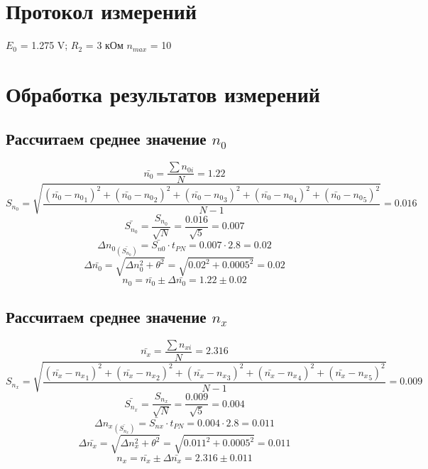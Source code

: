 \documentclass[a4paper,12pt]{report}
\begin{document}
\newpage

\section*{Протокол измерений}

\begin{flushleft}
    
\end{flushleft}

$E_0$ = 1.275 V; $R_2$ = 3 кОм $n_{max}$ = 10


\newpage
\section*{Обработка результатов измерений}

\subsection*{Рассчитаем среднее значение $n_0$}

\[ \bar{n_0} = \frac{\sum n_{0i}}{N} = 1.22 \]
\[S_{n_0}=\sqrt{\frac{(\bar{n_0}-{n_0}_1)^2+(\bar{n_0}-{n_0}_2)^2+(\bar{n_0}-{n_0}_3)^2+(\bar{n_0}-{n_0}_4)^2+(\bar{n_0}-{n_0}_5)^2}{N-1}} = 0.016\]
\[\bar{S_{n_0}}=\frac{S_{n_0}}{\sqrt{N}}=\frac{0.016}{\sqrt{5}}=0.007\]
\[ \Delta{n_0}_{(\bar{S_{n_0}})}=\bar{S_{n0}}\cdot t_{PN}=0.007\cdot 2.8=0.02 \]
\[ \Delta{\bar{n_0}}=\sqrt{\Delta n_0^2 + \theta^2}=\sqrt{0.02^2 + 0.0005^2}=0.02 \]
\[{n_0}=\bar{n_0}\pm \Delta{\bar{n_0}}=1.22\pm 0.02\]

\subsection*{Рассчитаем среднее значение $n_x$}

\[ \bar{n_x} = \frac{\sum n_{xi}}{N} = 2.316 \]
\[S_{n_x}=\sqrt{\frac{(\bar{n_x}-{n_x}_1)^2+(\bar{n_x}-{n_x}_2)^2+(\bar{n_x}-{n_x}_3)^2+(\bar{n_x}-{n_x}_4)^2+(\bar{n_x}-{n_x}_5)^2}{N-1}} = 0.009\]
\[\bar{S_{n_x}}=\frac{S_{n_x}}{\sqrt{N}}=\frac{0.009}{\sqrt{5}}=0.004\]
\[ \Delta{n_x}_{(\bar{S_{n_x}})}=\bar{S_{nx}}\cdot t_{PN}=0.004\cdot 2.8 = 0.011 \]
\[ \Delta{\bar{n_x}}=\sqrt{\Delta n_x^2 + \theta^2}=\sqrt{0.011^2 + 0.0005^2}=0.011 \]
\[{n_x}=\bar{n_x}\pm \Delta{\bar{n_x}}=2.316\pm 0.011\]
\end{document}
